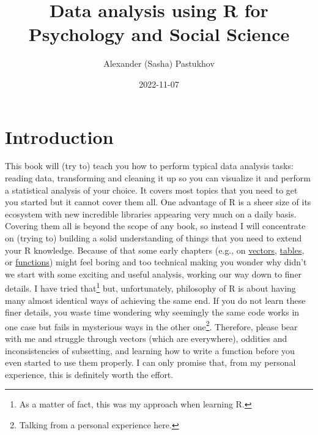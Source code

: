 \documentclass[
]{book}
\title{Data analysis using R for Psychology and Social Science}
\author{Alexander (Sasha) Pastukhov}
\date{2022-11-07}
\begin{document}
\maketitle

{
\setcounter{tocdepth}{1}
\tableofcontents
}
\hypertarget{introduction}{%
\chapter*{Introduction}\label{introduction}}

This book will (try to) teach you how to perform typical data analysis tasks: reading data, transforming and cleaning it up so you can visualize it and perform a statistical analysis of your choice. It covers most topics that you need to get you started but it cannot cover them all. One advantage of R is a sheer size of its ecosystem with new incredible libraries appearing very much on a daily basis. Covering them all is beyond the scope of any book, so instead I will concentrate on (trying to) building a solid understanding of things that you need to extend your R knowledge. Because of that some early chapters (e.g., on \protect\hyperlink{vectors}{vectors}, \protect\hyperlink{tables}{tables}, or \protect\hyperlink{ux5cux23functions}{functions}) might feel boring and too technical making you wonder why didn't we start with some exciting and useful analysis, working our way down to finer details. I have tried that\footnote{As a matter of fact, this was my approach when learning R.} but, unfortunately, philosophy of R is about having many almost identical ways of achieving the same end. If you do not learn these finer details, you waste time wondering why seemingly the same code works in one case but fails in mysterious ways in the other one\footnote{Talking from a personal experience here.}. Therefore, please bear with me and struggle through vectors (which are everywhere), oddities and inconsistencies of subsetting, and learning how to write a function before you even started to use them properly. I can only promise that, from my personal experience, this is definitely worth the effort.
\end{document}
